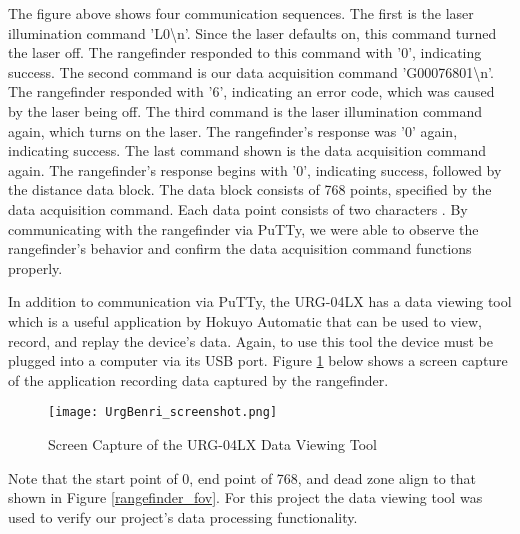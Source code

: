 The figure above shows four communication sequences. The first is the laser illumination command 'L0\textbackslash{}n'. Since the laser defaults on, this command turned the laser off. The rangefinder responded to this command with '0', indicating success. The second command is our data acquisition command 'G00076801\textbackslash{}n'. The rangefinder responded with '6', indicating an error code, which was caused by the laser being off. The third command is the laser illumination command again, which turns on the laser. The rangefinder's response was '0' again, indicating success. The last command shown is the data acquisition command again. The rangefinder's response begins with '0', indicating success, followed by the distance data block. The data block consists of 768 points, specified by the data acquisition command. Each data point consists of two characters \cite{urg04lx_datasheet}. By communicating with the rangefinder via PuTTy, we were able to observe the rangefinder's behavior and confirm the data acquisition command functions properly.
\par
In addition to communication via PuTTy, the URG-04LX has a data viewing tool which is a useful application by Hokuyo Automatic that can be used to view, record, and replay the device's data. Again, to use this tool the device must be plugged into a computer via its USB port. Figure \ref{URGBenriStandard_pic} below shows a screen capture of the application recording data captured by the rangefinder.

\begin{figure}[H]
	\centerline{\texttt{[image: UrgBenri\_screenshot.png]}}
	\caption{Screen Capture of the URG-04LX Data Viewing Tool \cite{URGBenriStandard_ref}}
	\label{URGBenriStandard_pic}
\end{figure}

Note that the start point of 0, end point of 768, and dead zone align to that shown in Figure \ref{rangefinder_fov}. For this project the data viewing tool was used to verify our project's data processing functionality.